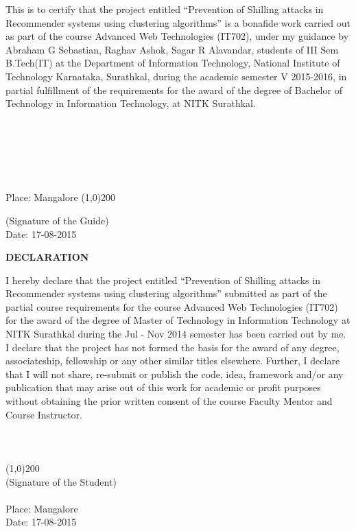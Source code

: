 \documentclass[12pt]{article}
\begin{document}
\null
This is to certify that the project entitled “Prevention of Shilling attacks in Recommender systems using clustering algorithms” is a bonafide work carried out as part of the course Advanced Web Technologies (IT702), under my guidance by Abraham G Sebastian, Raghav Ashok, Sagar R Alavandar, students of III Sem B.Tech(IT)  at the Department of Information Technology, National Institute of Technology Karnataka, Surathkal, during the academic semester V 2015-2016, in partial fulfillment of the requirements for the award of the degree of Bachelor of Technology in Information Technology, at NITK Surathkal.
\\
\\
\\
\\
\\
\\
\\
Place: Mangalore \hfill \line(1,0){200}

\hfill(Signature of the Guide) \\
Date: 17-08-2015\\
\clearpage
\thispagestyle{empty}
\begin{center}
\textbf{DECLARATION }\\
\end{center}
\null
I hereby declare that the project entitled “Prevention of Shilling attacks in Recommender systems using clustering algorithms” submitted as part of the partial course requirements for the course    Advanced Web Technologies (IT702) for the award of the degree of Master of Technology in Information Technology at NITK Surathkal during the Jul - Nov 2014 semester has been carried out by me. I declare that the project has not formed the basis for the award of any degree, associateship, fellowship or any other similar titles elsewhere.
Further, I declare that I will not share, re-submit or publish the code, idea, framework and/or any publication that may arise out of this work for academic or profit purposes without obtaining the prior written consent of the course Faculty Mentor and Course Instructor. 
\\ 
\\
\\
\\
\line(1,0){200}\\
(Signature of the Student)	
\\
\\
Place: Mangalore \\
Date: 17-08-2015\\
\clearpage
\end{document}
